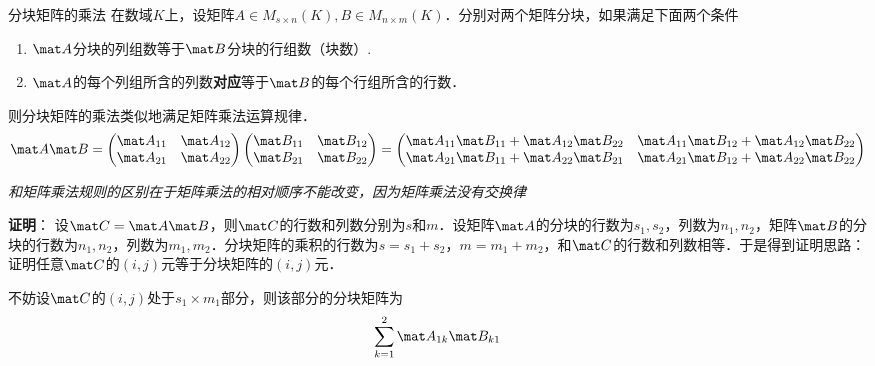 \begin{theorem}{分块矩阵的乘法}
在数域$K$上，设矩阵$A\in{M_{s\times{n}}(K)},B\in{M_{n\times{m}}(K)}$．分别对两个矩阵分块，如果满足下面两个条件
\begin{enumerate}
\item $\mat A$分块的列组数等于$\mat B$分块的行组数（块数）.
\item $\mat A$的每个列组所含的列数\textbf{对应}等于$\mat B$的每个行组所含的行数．
\end{enumerate}
则分块矩阵的乘法类似地满足矩阵乘法运算规律．
\begin{equation}
\mat A\mat B=
\begin{pmatrix}
\mat A_{11} & \mat A_{12}\\
\mat A_{21} & \mat A_{22}
\end{pmatrix}
\begin{pmatrix}
\mat B_{11} & \mat B_{12}\\
\mat B_{21} & \mat B_{22}
\end{pmatrix}
=
\begin{pmatrix}
\mat A_{11}\mat B_{11}+\mat A_{12}\mat B_{22} & \mat A_{11}\mat B_{12}+\mat A_{12}\mat B_{22}\\
\mat A_{21}\mat B_{11}+\mat A_{22}\mat B_{21} & \mat A_{21}\mat B_{12}+\mat A_{22}\mat B_{22}
\end{pmatrix}
\end{equation}
\end{theorem}
\textsl{和矩阵乘法规则的区别在于矩阵乘法的相对顺序不能改变，因为矩阵乘法没有交换律}

\textbf{证明}：
设$\mat C=\mat A\mat B$，则$\mat C$的行数和列数分别为$s$和$m$．设矩阵$\mat A$的分块的行数为$s_1,s_2$，列数为$n_1,n_2$，矩阵$\mat B$的分块的行数为$n_1,n_2$，列数为$m_1,m_2$．分块矩阵的乘积的行数为$s=s_1+s_2$，$m=m_1+m_2$，和$\mat C$的行数和列数相等．于是得到证明思路：证明任意$\mat C$的$(i,j)$元等于分块矩阵的$(i,j)$元．

不妨设$\mat C$的$(i,j)$处于$s_1\times{m_1}$部分，则该部分的分块矩阵为
\[\sum_{k=1}^{2}\mat A_{1k}\mat B_{k1}\]


